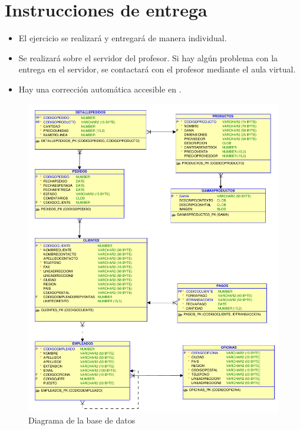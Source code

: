 \section{Instrucciones de entrega}
\begin{itemize}
\item El ejercicio se realizará y entregará de manera individual.
\item Se realizará sobre el servidor del profesor. Si hay algún problema con la entrega en el servidor, se contactará con el profesor mediante el aula virtual.
\item Hay una corrección automática accesible en .
\end{itemize}



\begin{figure}[h]
  \begin{center}
    \includegraphics[width=.9\textwidth]{./jardineria.pdf}
  \end{center}
  \caption{Diagrama de la base de datos}\label{fig:esquema}
\end{figure}






